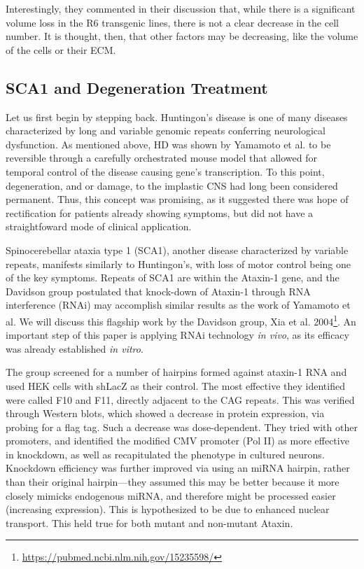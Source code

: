 Interestingly, they commented in their discussion that, while there is a significant volume loss in the R6 transgenic lines, there is not a clear  decrease in the cell number. It is thought, then, that other factors may be decreasing, like the volume of the cells or their ECM. 

\subsection*{SCA1 and Degeneration Treatment}

Let us first begin by stepping back. Huntingon's disease is one of many diseases characterized by long and variable genomic repeats conferring neurological dysfunction. As mentioned above, HD was shown by Yamamoto et al. to be reversible through a carefully orchestrated mouse model that allowed for temporal control of the disease causing gene's transcription. To this point, degeneration, and or damage, to the implastic CNS had long been considered permanent. Thus, this concept was promising, as it suggested there was hope of rectification for patients already showing symptoms, but did not have a straightfoward mode of clinical application.\newline


Spinocerebellar ataxia type 1 (SCA1), another disease characterized by variable repeats, manifests similarly to Huntingon's, with loss of motor control being one of the key symptoms. Repeats of SCA1 are within the Ataxin-1 gene, and the Davidson group postulated that knock-down of Ataxin-1 through RNA interference (RNAi) may accomplish similar results as the work of Yamamoto et al. We will discuss this flagship work by the Davidson group, Xia et al. 2004\footnote{\url{https://pubmed.ncbi.nlm.nih.gov/15235598/}}. An important step of this paper is applying RNAi technology \textit{in vivo}, as its efficacy was already established \textit{in vitro}.\newline

The group screened for a number of hairpins formed against ataxin-1 RNA and used HEK cells with shLacZ as their control. The most effective they identified were called F10 and F11, directly adjacent to the CAG repeats. This was verified through Western blots, which showed a decrease in protein expression, via probing for a flag tag. Such a decrease was dose-dependent. They tried with other promoters, and identified the modified CMV promoter (Pol II) as more effective in knockdown, as well as recapitulated the phenotype in cultured neurons. Knockdown efficiency was further improved via using an miRNA hairpin, rather than their original hairpin---they assumed this may be better because it more closely mimicks endogenous miRNA, and therefore might be processed easier (increasing expression). This is hypothesized to be due to enhanced nuclear transport. This held true for both mutant and non-mutant Ataxin.\newline

